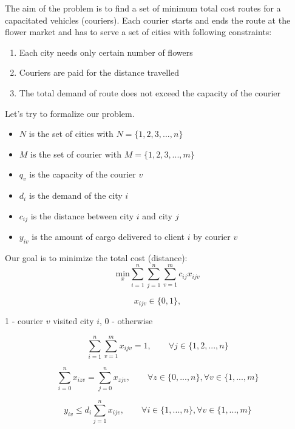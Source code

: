 \documentclass{article}
\begin{document}
The aim of the problem is to find a set of minimum total cost routes for a capacitated vehicles (couriers). Each courier starts and ends the route at the flower market and has to serve a set of cities with following constraints:
\begin{enumerate}
  \item Each city needs only certain number of flowers
  \item Couriers are paid for the distance travelled 
  \item The total demand of route does not exceed the capacity of the courier
\end{enumerate}
Let's try to formalize our problem. 
\begin{itemize}
  \item $N$ is the set of cities with $N = \{1,2,3,...,n\}$
  \item $M$ is the set of courier with $M = \{1,2,3,...,m\}$
  \item $q_v$ is the capacity of the courier $v$
  \item $d_i$ is the demand of the city $i$
  \item $c_{ij}$ is the distance between city $i$ and city $j$
  \item $y_{iv}$ is the amount of cargo delivered to client $i$ by courier $v$  
\end{itemize}

Our goal is to minimize the total cost (distance):
\begin{equation} \label{min}
\underset{x}{\text{min}}  \sum_{i=1}^{n}\sum_{j=1}^{n}\sum_{v=1}^{m} c_{ij}x_{ijv}
\end{equation}

\begin{equation} \label{x}
x_{ijv} \in \{0,1\}, 
\end{equation}
\begin{center}
   1 - courier  $v$ visited city $i$, 0 - otherwise 
\end{center}


\begin{equation} \label{3rd}
\sum_{i=1}^{n}\sum_{v=1}^{m} x_{ijv} = 1, \qquad \forall j \in \{1,2,...,n\}
\end{equation}

\begin{equation} \label{4th}
\sum_{i=0}^{n} x_{izv} = \sum_{j=0}^{n} x_{zjv} , \qquad \forall z \in \{0,...,n\}, \forall v \in \{1,...,m\}
\end{equation}

\begin{equation} \label{5th}
y_{iv} \leq d_i\sum_{j=1}^{n} x_{ijv}, \qquad \forall i \in \{1,...,n\}, \forall v \in \{1,...,m\}
\end{equation}
\end{document}
